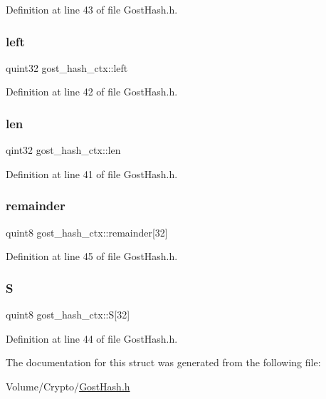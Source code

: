 Definition at line 43 of file Gost\+Hash.\+h.

\mbox{\label{structgost__hash__ctx_a9cce4ab415de16b79763ce40d78ad755}} 
\subsubsection{\texorpdfstring{left}{left}}
{\footnotesize\ttfamily quint32 gost\+\_\+hash\+\_\+ctx\+::left}



Definition at line 42 of file Gost\+Hash.\+h.

\mbox{\label{structgost__hash__ctx_ae8548a1a59e28025df62641a524027f0}} 
\subsubsection{\texorpdfstring{len}{len}}
{\footnotesize\ttfamily qint32 gost\+\_\+hash\+\_\+ctx\+::len}



Definition at line 41 of file Gost\+Hash.\+h.

\mbox{\label{structgost__hash__ctx_af6eb15c486c0155a5d6ffba7fbabb317}} 
\subsubsection{\texorpdfstring{remainder}{remainder}}
{\footnotesize\ttfamily quint8 gost\+\_\+hash\+\_\+ctx\+::remainder\mbox{[}32\mbox{]}}



Definition at line 45 of file Gost\+Hash.\+h.

\mbox{\label{structgost__hash__ctx_aa1216c9e2af0262da341e420eeb89e51}} 
\subsubsection{\texorpdfstring{S}{S}}
{\footnotesize\ttfamily quint8 gost\+\_\+hash\+\_\+ctx\+::S\mbox{[}32\mbox{]}}



Definition at line 44 of file Gost\+Hash.\+h.



The documentation for this struct was generated from the following file\+:\begin{DoxyCompactItemize}
\item 
Volume/\+Crypto/\hyperlink{_gost_hash_8h}{Gost\+Hash.\+h}\end{DoxyCompactItemize}
